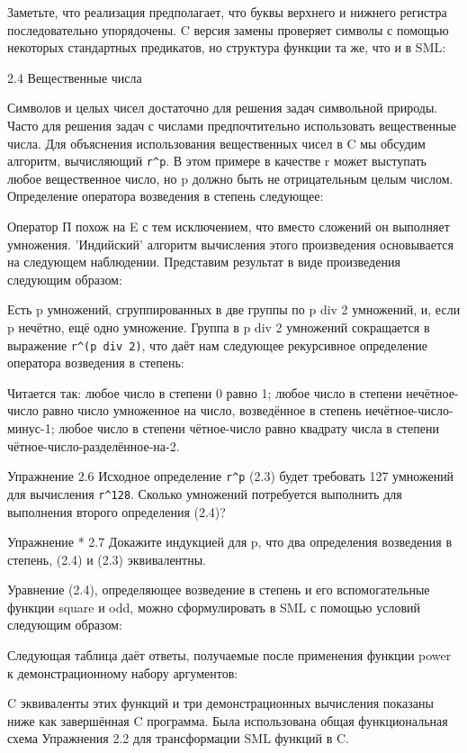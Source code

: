 Заметьте, что реализация предполагает, что буквы верхнего и нижнего регистра последовательно упорядочены. C версия замены проверяет символы с помощью некоторых стандартных предикатов, но структура функции та же, что и в SML:

2.4 Вещественные числа

Символов и целых чисел достаточно для решения задач символьной природы. Часто для решения задач с числами предпочтительно использовать вещественные числа. Для объяснения использования вещественных чисел в C мы обсудим алгоритм, вычисляющий \lstinline|r^p|. В этом примере в качестве r может выступать любое вещественное число, но p должно быть не отрицательным целым числом. Определение оператора возведения в степень следующее:

Оператор П похож на E с тем исключением, что вместо сложений он выполняет умножения. 'Индийский' алгоритм вычисления этого произведения основывается на следующем наблюдении. Представим результат в виде произведения следующим образом:

Есть p умножений, сгруппированных в две группы по p div 2 умножений, и, если p нечётно, ещё одно умножение. Группа в p div 2 умножений сокращается в выражение \lstinline|r^(p div 2)|, что даёт нам следующее рекурсивное определение оператора возведения в степень:

Читается так: любое число в степени 0 равно 1; любое число в степени нечётное-число равно число умноженное на число, возведённое в степень нечётное-число-минус-1; любое число в степени чётное-число равно квадрату числа в степени чётное-число-разделённое-на-2.

Упражнение 2.6 Исходное определение \lstinline|r^p| (2.3) будет требовать 127 умножений для вычисления \lstinline|r^128|. Сколько умножений потребуется выполнить для выполнения второго определения (2.4)?

Упражнение * 2.7 Докажите индукцией для p, что два определения возведения в степень, (2.4) и (2.3) эквивалентны.

Уравнение (2.4), определяющее возведение в степень и его вспомогательные функции square и odd, можно сформулировать в SML с помощью условий следующим образом:

Следующая таблица даёт ответы, получаемые после применения функции power к демонстрационному набору аргументов:

C эквиваленты этих функций и три демонстрационных вычисления показаны ниже как завершённая C программа. Была использована общая функциональная схема Упражнения 2.2 для трансформации SML функций в C.

